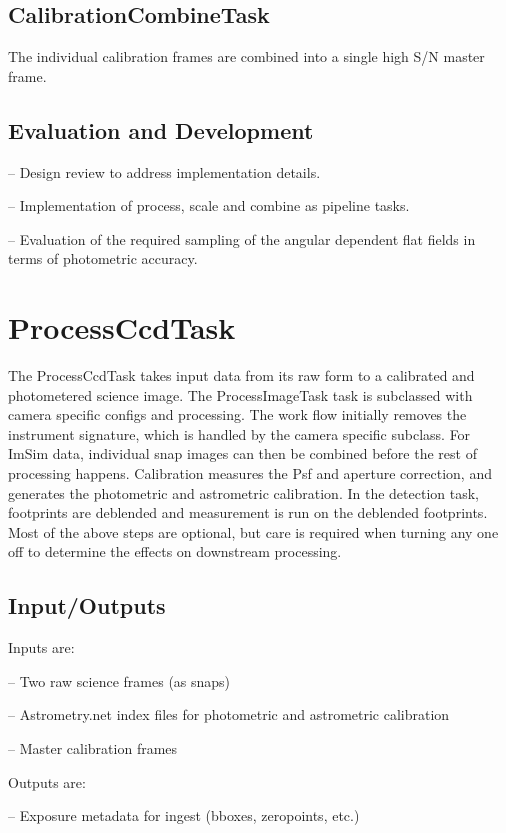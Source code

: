 \documentclass[prd, nofootinbib, floatfix, 11pt,tightenlines,times]{article}
\begin{document}
\subsection{CalibrationCombineTask}
The individual calibration frames are combined into a single high S/N master frame. 

\subsection{Evaluation and Development}

-- Design review to address implementation details.

-- Implementation of process, scale and combine as pipeline tasks.

-- Evaluation of the required sampling of the angular dependent flat
fields in terms of photometric accuracy.



\section{ProcessCcdTask\label{processccdsec}} 
The ProcessCcdTask takes input data from its raw form to a calibrated
and photometered science image. The ProcessImageTask task is
subclassed with camera specific configs and processing. The work flow
initially removes the instrument signature, which is handled by the
camera specific subclass.  For ImSim data, individual snap images can
then be combined before the rest of processing happens. Calibration
measures the Psf and aperture correction, and generates the
photometric and astrometric calibration.  In the detection task,
footprints are deblended and measurement is run on the deblended
footprints.  Most of the above steps are optional, but care is
required when turning any one off to determine the effects on downstream processing.

\subsection{Input/Outputs}
Inputs are:

-- Two raw science frames (as snaps)

-- Astrometry.net index files for photometric and astrometric calibration

-- Master calibration frames


Outputs are:

-- Exposure metadata for ingest (bboxes, zeropoints, etc.)
\end{document}
